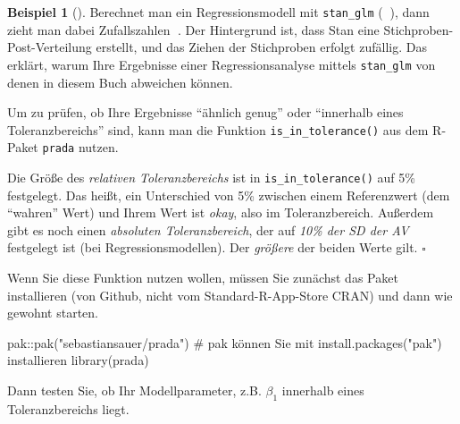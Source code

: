 \documentclass[
  ngerman,
  letterpaper,
  twoside,
  open=any]{scrbook}
\newenvironment{Shaded}{\begin{snugshade}}{\end{snugshade}}
\newcommand{\CommentTok}[1]{\textcolor[rgb]{0.37,0.37,0.37}{#1}}
\newcommand{\FunctionTok}[1]{\textcolor[rgb]{0.28,0.35,0.67}{#1}}
\newcommand{\NormalTok}[1]{\textcolor[rgb]{0.00,0.23,0.31}{#1}}
\newcommand{\SpecialCharTok}[1]{\textcolor[rgb]{0.37,0.37,0.37}{#1}}
\newcommand{\StringTok}[1]{\textcolor[rgb]{0.13,0.47,0.30}{#1}}
\theoremstyle{definition}
\newtheorem{example}{Beispiel}[chapter]
\theoremstyle{plain}
\theoremstyle{definition}
\theoremstyle{definition}
\theoremstyle{remark}
\begin{document}
\begin{example}[]
Berechnet man ein Regressionsmodell mit \texttt{stan\_glm} (🤖😁), dann
zieht man dabei Zufallszahlen 🎲. Der Hintergrund ist, dass Stan eine
Stichproben-Post-Verteilung erstellt, und das Ziehen der Stichproben
erfolgt zufällig. Das erklärt, warum Ihre Ergebnisse einer
Regressionsanalyse mittels \texttt{stan\_glm} von denen in diesem Buch
abweichen können.

Um zu prüfen, ob Ihre Ergebnisse \enquote{ähnlich genug} oder
\enquote{innerhalb eines Toleranzbereichs} sind, kann man die Funktion
\texttt{is\_in\_tolerance()} aus dem R-Paket \texttt{prada} nutzen.

\begin{tcolorbox}[enhanced jigsaw, arc=.35mm, bottomrule=.15mm, bottomtitle=1mm, breakable, colback=white, colbacktitle=quarto-callout-note-color!10!white, colframe=quarto-callout-note-color-frame, coltitle=black, left=2mm, leftrule=.75mm, opacityback=0, opacitybacktitle=0.6, rightrule=.15mm, title=\textcolor{quarto-callout-note-color}{\faInfo}\hspace{0.5em}{Größe des Toleranzbereichs}, titlerule=0mm, toprule=.15mm, toptitle=1mm]

Die Größe des \emph{relativen Toleranzbereichs} ist in
\texttt{is\_in\_tolerance()} auf 5\% festgelegt. Das heißt, ein
Unterschied von 5\% zwischen einem Referenzwert (dem \enquote{wahren}
Wert) und Ihrem Wert ist \emph{okay}, also im Toleranzbereich. Außerdem
gibt es noch einen \emph{absoluten Toleranzbereich}, der auf \emph{10\%
der SD der AV} festgelegt ist (bei Regressionsmodellen). Der
\emph{größere} der beiden Werte gilt. \(\square\)

\end{tcolorbox}

Wenn Sie diese Funktion nutzen wollen, müssen Sie zunächst das Paket
installieren (von Github, nicht vom Standard-R-App-Store CRAN) und dann
wie gewohnt starten.

\begin{Shaded}
\begin{Highlighting}[]
\NormalTok{pak}\SpecialCharTok{::}\FunctionTok{pak}\NormalTok{(}\StringTok{"sebastiansauer/prada"}\NormalTok{)  }\CommentTok{\# \textasciigrave{}pak\textasciigrave{} können Sie mit \textasciigrave{}install.packages("pak")\textasciigrave{} installieren}
\FunctionTok{library}\NormalTok{(prada)}
\end{Highlighting}
\end{Shaded}

Dann testen Sie, ob Ihr Modellparameter, z.B. \(\beta_1\) innerhalb
eines Toleranzbereichs liegt.


\end{example}
\end{document}
